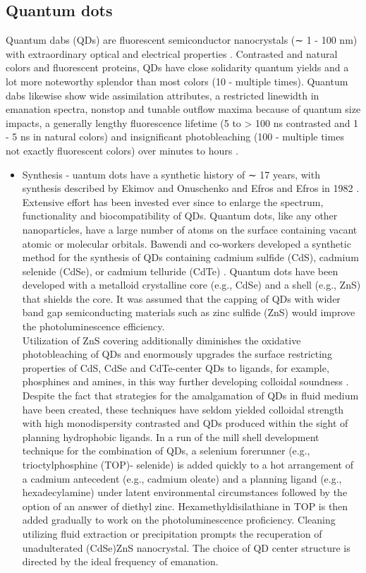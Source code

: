 \documentclass{article}
\begin{document}
\subsection*{ Quantum dots}
Quantum dabs (QDs) are fluorescent semiconductor nanocrystals (∼ 1 - 100 nm) with extraordinary optical and electrical properties . Contrasted and natural colors and fluorescent proteins, QDs have close solidarity quantum yields and a lot more noteworthy splendor than most colors (10 - multiple times). Quantum dabs likewise show wide assimilation attributes, a restricted linewidth in emanation spectra, nonstop and tunable outflow maxima because of quantum size impacts, a generally lengthy fluorescence lifetime (5 to > 100 ns contrasted and 1 - 5 ns in natural colors) and insignificant photobleaching (100 - multiple times not exactly fluorescent colors) over minutes to hours .
\begin{itemize}
    \item Synthesis - uantum dots have a synthetic history of ∼ 17 years, with synthesis described by Ekimov and Onuschenko and Efros and Efros in 1982 . Extensive effort has been invested ever since to enlarge the spectrum, functionality and biocompatibility of QDs. Quantum dots, like any other nanoparticles, have a large number of atoms on the surface containing vacant atomic or molecular orbitals. Bawendi and co-workers developed a synthetic method for the synthesis of QDs containing cadmium sulfide (CdS), cadmium selenide (CdSe), or cadmium telluride (CdTe) . Quantum dots have been developed with a metalloid crystalline core (e.g., CdSe) and a shell (e.g., ZnS) that shields the core. It was assumed that the capping of QDs with wider band gap semiconducting materials such as zinc sulfide (ZnS) would improve the photoluminescence efficiency.
    \\Utilization of ZnS covering additionally diminishes the oxidative photobleaching of QDs  and enormously upgrades the surface restricting properties of CdS, CdSe and CdTe-center QDs to ligands, for example, phosphines and amines, in this way further developing colloidal soundness . Despite the fact that strategies for the amalgamation of QDs in fluid medium have been created, these techniques have seldom yielded colloidal strength with high monodispersity contrasted and QDs produced within the sight of planning hydrophobic ligands. In a run of the mill shell development technique for the combination of QDs, a selenium forerunner (e.g., trioctylphosphine (TOP)- selenide) is added quickly to a hot arrangement of a cadmium antecedent (e.g., cadmium oleate) and a planning ligand (e.g., hexadecylamine) under latent environmental circumstances followed by the option of an answer of diethyl zinc. Hexamethyldisilathiane in TOP is then added gradually to work on the photoluminescence proficiency. Cleaning utilizing fluid extraction or precipitation prompts the recuperation of unadulterated (CdSe)ZnS nanocrystal. The choice of QD center structure is directed by the ideal frequency of emanation.
    
\end{itemize}





 
 
\end{document}
